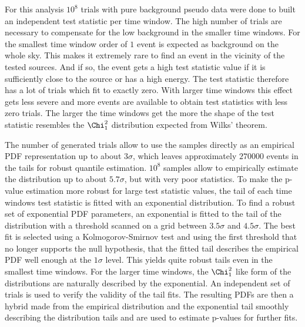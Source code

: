 For this analysis $10^8$ trials with pure background pseudo data were done to built an independent test statistic per time window.
The high number of trials are necessary to compensate for the low background in the smaller time windows.
For the smallest time window order of $1$ event is expected as background on the whole sky.
This makes it extremely rare to find an event in the vicinity of the tested sources.
And if so, the event gets a high test statistic value if it is sufficiently close to the source or has a high energy.
The test statistic therefore has a lot of trials which fit to exactly zero.
With larger time windows this effect gets less severe and more events are available to obtain test statistics with less zero trials.
The larger the time windows get the more the shape of the test statistic resembles the $\Chi^2_1$ distribution expected from Wilks' theorem.

The number of generated trials allow to use the samples directly as an empirical PDF representation up to about $3\sigma$, which leaves approximately $\num{270000}$ events in the tails for robust quantile estimation.
$10^8$ samples allow to empirically estimate the distribution up to about $5.7\sigma$, but with very poor statistics.
To make the p-value estimation more robust for large test statistic values, the tail of each time windows test statistic is fitted with an exponential distribution.
To find a robust set of exponential PDF parameters, an exponential is fitted to the tail of the distribution with a threshold scanned on a grid between $3.5\sigma$ and $4.5\sigma$.
The best fit is selected using a Kolmogorov-Smirnov test  and using the first threshold that no longer supports the null hypothesis, that the fitted tail describes the empirical PDF well enough at the $1\sigma$ level.
This yields quite robust tails even in the smallest time windows.
For the larger time windows, the $\Chi^2_1$ like form of the distributions are naturally described by the exponential.
An independent set of trials is used to verify the validity of the tail fits.
The resulting PDFs are then a hybrid made from the empirical distribution and the exponential tail smoothly describing the distribution tails and are used to estimate p-values for further fits.

